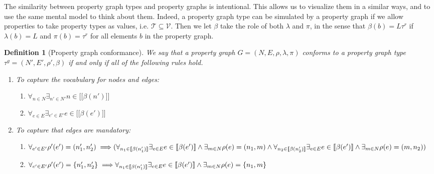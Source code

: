 \documentclass[a4paper]{article}
\newtheorem{definition}[theorem]{Definition}
\newcommand{\ptypes}{\mathcal{T}}
\newcommand{\rtype}{\tau^r}
\newcommand{\gtype}{\tau^g}
\newcommand{\lsem}{\ensuremath{[\![}}
\newcommand{\rsem}{\ensuremath{]\!]}}
\newcommand{\sem}[1]{\ensuremath{\lsem #1 \rsem}}
\begin{document}
The similarity between property graph types and property graphs is intentional. This allows us to visualize them in a similar ways, and to use the same mental model to think about them. Indeed, a property graph type can be simulated by a property graph if we allow properties to take property types as values, i.e. $\ptypes \subseteq \mathcal{V}$. Then we let $\beta$ take the role of both $\lambda$ and $\pi$, in the sense that $\beta(b) = L\rtype$ if $\lambda(b) = L$ and $\pi(b) = \rtype$ for all elements $b$ in the property graph.

\begin{definition}[Property graph conformance]
  We say that a property graph $G = (N, E, \rho, \lambda, \pi)$ \emph{conforms} to a property graph type $\gtype = (N', E', \rho', \beta)$ if and only if all of the following rules hold.

  \begin{enumerate}
    \item To capture the vocabulary for nodes and edges:
    \begin{enumerate}
      \item $\forall_{n \in N} \exists_{n' \in N'} n \in \sem{\beta(n')}$
      \item $\forall_{e \in E} \exists_{e' \in E'} e \in \sem{\beta(e')}$
    \end{enumerate}
    \item To capture that edges are mandatory:
    \begin{enumerate}
      \item $\forall_{e' \in E'} \rho'(e') = (n'_1, n'_2) \implies
      \\\\(\forall_{n_1 \in \sem{\beta(n'_1)}} \exists_{e \in E} e \in \sem{\beta(e')} \wedge \exists_{m \in N} \rho(e) = (n_1, m) \wedge
      \\\\ \forall_{n_2 \in \sem{\beta(n'_2)}} \exists_{e \in E} e \in \sem{\beta(e')} \wedge \exists_{m \in N} \rho(e) = (m, n_2))$

      \item $\forall_{e' \in E'} \rho'(e') = \{n'_1, n'_2\} \implies
      \\\\\forall_{n_1 \in \sem{\beta(n'_1)}} \exists_{e \in E} e \in \sem{\beta(e')} \wedge \exists_{m \in N} \rho(e) = \{n_1, m\}$
    \end{enumerate}
  \end{enumerate}
\end{definition}
\end{document}
